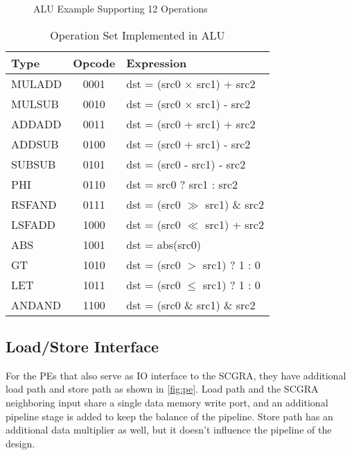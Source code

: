 \begin{figure}[h]
\caption{ALU Example Supporting 12 Operations}
\label{fig:ALU}
\end{figure} 

\begin{table}[h]
\caption{Operation Set Implemented in ALU}
\label{tab:operations}
\centering
\begin{tabular}{l|c|l}
\hline
Type & Opcode & Expression \\

\hline
MULADD & 0001 & {dst = (src0 $\times$ src1) + src2} \\

\hline
MULSUB & 0010 & {dst = (src0 $\times$ src1) - src2} \\

\hline
ADDADD & 0011 & {dst = (src0 + src1) + src2} \\

\hline
ADDSUB & 0100 & {dst = (src0 + src1) - src2} \\

\hline
SUBSUB & 0101 & {dst = (src0 - src1) - src2} \\

\hline 
PHI & 0110 & {dst = src0 ? src1 : src2} \\

\hline
RSFAND & 0111 & {dst = (src0 $\gg$ src1) \& src2} \\

\hline
LSFADD & 1000 & {dst = (src0 $\ll$ src1) + src2} \\

\hline
ABS & 1001 & {dst = abs(src0)} \\

\hline
GT & 1010 & {dst = (src0 $>$ src1) ? 1 : 0} \\

\hline
LET & 1011 & {dst = (src0 $\leq$ src1) ? 1 : 0} \\

\hline
ANDAND & 1100 & {dst = (src0 \& src1) \& src2} \\

\hline
\end{tabular}
\end{table}

\subsection{Load/Store Interface}
For the PEs that also serve as IO interface to the SCGRA, they have additional load path and store path as shown in \ref{fig:pe}. Load path and the SCGRA neighboring input share a single data memory write port, and an additional pipeline stage is added to keep the balance of the pipeline. Store path has an additional data multiplier as well, but it doesn't influence the pipeline of the design. 


